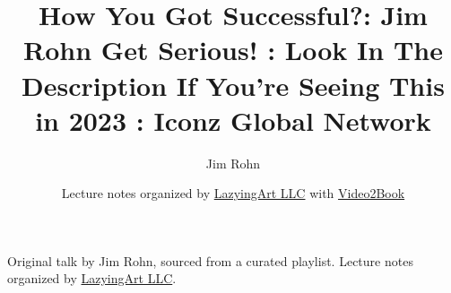 \documentclass[11pt,oneside]{book}
\begin{document}
\frontmatter
\title{How You Got Successful?: Jim Rohn Get Serious! : Look In The Description If You're Seeing This in 2023 : Iconz Global Network}
\author{Jim Rohn}
\date{Lecture notes organized by \href{https://lazying.art}{LazyingArt LLC} with \href{https://github.com/lachlanchen/Video2Book}{Video2Book}}
\maketitle
\begin{center}
\small Original talk by Jim Rohn, sourced from a curated playlist. Lecture notes organized by \href{https://lazying.art}{LazyingArt LLC}.
\end{center}
\clearpage
\mainmatter

\end{document}
